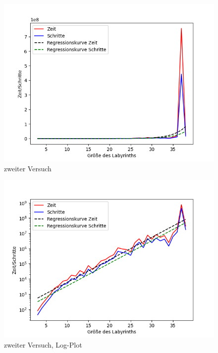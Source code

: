 \documentclass[11pt, a4paper]{article}
\begin{document}
\begin{figure}[h]
	\centering
	\includegraphics[scale=.5]{v2Aus.png}
	\caption{zweiter Versuch}
	\label{fig:Plot v2}
\end{figure}
\begin{figure}[h]
	\centering
	\includegraphics[scale=.5]{v2AusLog.png}
	\caption{zweiter Versuch, Log-Plot}
	\label{fig:Plot v2Log}
\end{figure}

\newpage
\end{document}
